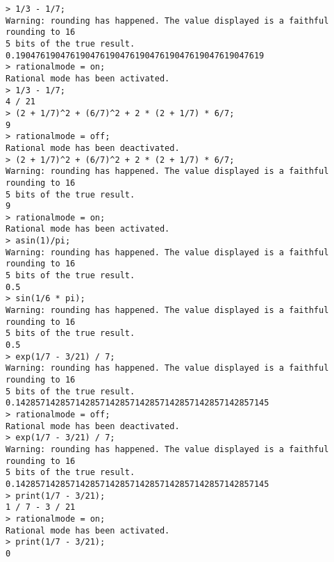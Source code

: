 \begin{center}\begin{minipage}{15cm}\begin{Verbatim}[frame=single]
> 1/3 - 1/7;
Warning: rounding has happened. The value displayed is a faithful rounding to 16
5 bits of the true result.
0.19047619047619047619047619047619047619047619047619
> rationalmode = on;
Rational mode has been activated.
> 1/3 - 1/7;
4 / 21
> (2 + 1/7)^2 + (6/7)^2 + 2 * (2 + 1/7) * 6/7;
9
> rationalmode = off;
Rational mode has been deactivated.
> (2 + 1/7)^2 + (6/7)^2 + 2 * (2 + 1/7) * 6/7;
Warning: rounding has happened. The value displayed is a faithful rounding to 16
5 bits of the true result.
9
> rationalmode = on;
Rational mode has been activated.
> asin(1)/pi;
Warning: rounding has happened. The value displayed is a faithful rounding to 16
5 bits of the true result.
0.5
> sin(1/6 * pi);
Warning: rounding has happened. The value displayed is a faithful rounding to 16
5 bits of the true result.
0.5
> exp(1/7 - 3/21) / 7;
Warning: rounding has happened. The value displayed is a faithful rounding to 16
5 bits of the true result.
0.142857142857142857142857142857142857142857142857145
> rationalmode = off;
Rational mode has been deactivated.
> exp(1/7 - 3/21) / 7;
Warning: rounding has happened. The value displayed is a faithful rounding to 16
5 bits of the true result.
0.142857142857142857142857142857142857142857142857145
> print(1/7 - 3/21);
1 / 7 - 3 / 21
> rationalmode = on;
Rational mode has been activated.
> print(1/7 - 3/21);
0
\end{Verbatim}
\end{minipage}\end{center}
